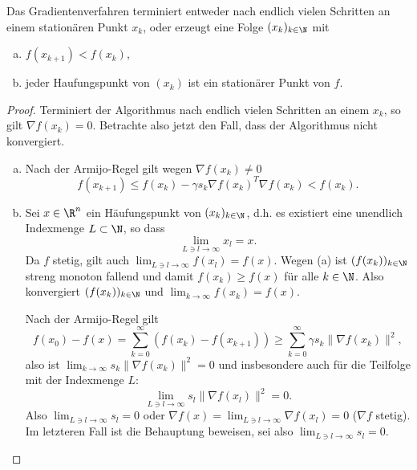 \begin{st} \label{2.24}
	Das Gradientenverfahren %
	terminiert entweder nach endlich vielen Schritten an einem stationären Punkt $x_k$, oder erzeugt eine Folge $(x_k)_{k\in\N}$ mit
	\begin{enumerate}[(a)]
		\item
			$f(x_{k+1}) < f(x_k)$,
		\item
			jeder Haufungspunkt von $(x_k)$ ist ein stationärer Punkt von $f$.
	\end{enumerate}
	\begin{proof}
		Terminiert der Algorithmus
		nach endlich vielen Schritten an einem $x_k$, so gilt $\nabla f(x_k) = 0$.
		Betrachte also jetzt den Fall, dass der Algorithmus nicht konvergiert.
		\begin{enumerate}[a)]
			\item
				Nach der Armijo-Regel gilt wegen $\nabla f(x_k) \neq 0$
				\[
					f(x_{k+1})
					\le f(x_k) - \gamma s_k \nabla f(x_k)^T \nabla f(x_k)
					< f(x_k).
				\]
			\item
				Sei $x \in \R^n$ ein Häufungspunkt von $(x_k)_{k\in\N}$, d.h. es existiert eine unendlich Indexmenge $L \subset \N$, so dass
				\[
					\lim_{L \ni l \to \infty} x_l = x.
				\]
				Da $f$ stetig, gilt auch $\lim_{L \ni l \to \infty} f(x_l) = f(x)$.
				Wegen (a) ist $(f(x_k))_{k\in\N}$ streng monoton fallend und damit $f(x_k) \ge f(x)$ für alle $k \in \N$.
				Also konvergiert $(f(x_k))_{k\in\N}$ und $\lim_{k\to \infty} f(x_k) = f(x)$.

				Nach der Armijo-Regel gilt
				\[
					f(x_0) - f(x)
					= \sum_{k=0}^\infty (f(x_k) - f(x_{k+1}))
					\ge \sum_{k=0}^\infty \gamma s_k \| \nabla f(x_k) \|^2,
				\]
				also ist $\lim_{k\to\infty} s_k \|\nabla f(x_k)\|^2 = 0$ und insbesondere auch für die Teilfolge mit der Indexmenge $L$:
				\[
					\lim_{L \ni l \to \infty} s_l \|\nabla f(x_l)\|^2 = 0.
				\]
				Also $\lim_{L \ni l \to \infty} s_l = 0$ oder $\nabla f(x) = \lim_{L \ni l \to\infty} \nabla f(x_l) = 0$ ($\nabla f$ stetig).
				Im letzteren Fall ist die Behauptung beweisen, sei also $\lim_{L \ni l \to \infty} s_l = 0$.


\end{enumerate}
\end{proof}
\end{st}

